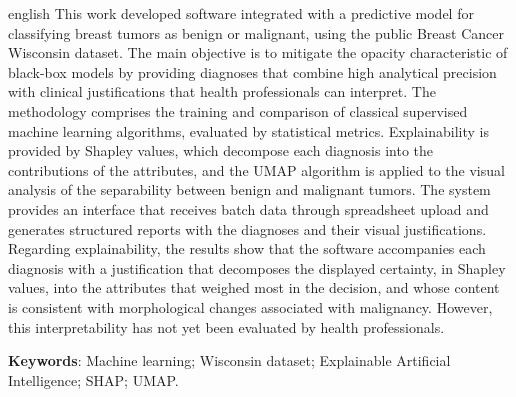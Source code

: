 \documentclass[
    12pt
    ,oneside
    ,a4paper
    ,chapter=TITLE
    ,section=TITLE
    ,sumario=abnt-6027-2012
    ,english,brazil]{abntex2} %
\begin{document}
\begin{resumo}[ABSTRACT]
\begin{otherlanguage*}{english}
    This work developed software integrated with a predictive model for classifying breast tumors as benign or malignant, using the public Breast Cancer Wisconsin dataset.
    The main objective is to mitigate the opacity characteristic of black-box models by providing diagnoses that combine high analytical precision with clinical justifications that health professionals can interpret.
    The methodology comprises the training and comparison of classical supervised machine learning algorithms, evaluated by statistical metrics.
    Explainability is provided by Shapley values, which decompose each diagnosis into the contributions of the attributes, and the UMAP algorithm is applied to the visual analysis of the separability between benign and malignant tumors.
    The system provides an interface that receives batch data through spreadsheet upload and generates structured reports with the diagnoses and their visual justifications.
    Regarding explainability, the results show that the software accompanies each diagnosis with a justification that decomposes the displayed certainty, in Shapley values, into the attributes that weighed most in the decision, and whose content is consistent with morphological changes associated with malignancy. However, this interpretability has not yet been evaluated by health professionals.

    \vspace{.6cm}\textbf{Keywords}: Machine learning; Wisconsin dataset; Explainable Artificial Intelligence; SHAP; UMAP.
\end{otherlanguage*}
\end{resumo}


\listadecodigos
\listadefiguras
\listadegraficos
\listadequadros
\end{document}
